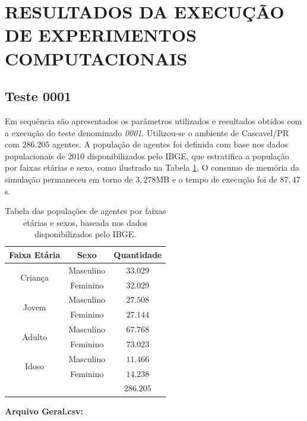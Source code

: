 \section{RESULTADOS DA EXECUÇÃO DE EXPERIMENTOS COMPUTACIONAIS}
\label{sec:resultados}

\subsection{Teste 0001}

Em sequência são apresentados os parâmetros utilizados e resultados obtidos com a execução do teste denominado \textit{0001}. Utilizou-se o ambiente de Cascavel/PR com $286.205$ agentes. A população de agentes foi definida com base nos dados populacionais de 2010 disponibilizados pelo IBGE, que estratifica a população por faixas etárias e sexo, como ilustrado na Tabela \ref{tab:populacoes_0001}. O consumo de memória da simulação permaneceu em torno de $3,278$MB e o tempo de execução foi de $87,47$s. \\

\begin{table}[H]
\centering
\begin{tabular}{c|c|c}
 \textbf{Faixa Etária} 		& \textbf{Sexo}		& \textbf{Quantidade}	\\ \hline
  \multirow{2}{*}{Criança}	& Masculino		& $33.029$		\\
				& Feminino		& $32.029$		\\
  \multirow{2}{*}{Jovem}	& Masculino		& $27.508$		\\
				& Feminino		& $27.144$		\\
  \multirow{2}{*}{Adulto}	& Masculino		& $67.768$		\\
				& Feminino		& $73.023$		\\
  \multirow{2}{*}{Idoso}	& Masculino		& $11.466$		\\
				& Feminino		& $14.238$		\\ \hline
  \multicolumn{2}{c|}{}					& $286.205$		\\
\end{tabular}
\caption{Tabela das populações de agentes por faixas etárias e sexos, baseada nos dados disponibilizados pelo IBGE.}
\label{tab:populacoes_0001}
\end{table}

\newpage

\textbf{Arquivo Geral.csv:} 

\begin{center}
\end{center}

